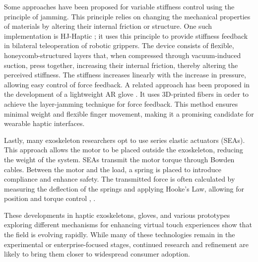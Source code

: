 \bigskip \noindent
Some approaches have been proposed for variable stiffness control using the principle of jamming. This principle relies on changing the mechanical properties of materials by altering their internal friction or structure. One such implementation is HJ-Haptic \cite{HJHaptic}; it uses this principle to provide stiffness feedback in bilateral teleoperation of robotic grippers. The device consists of flexible, honeycomb-structured layers that, when compressed through vacuum-induced suction, press together, increasing their internal friction, thereby altering the perceived stiffness. The stiffness increases linearly with the increase in pressure, allowing easy control of force feedback. A related approach has been proposed in the development of a lightweight AR glove \cite{gloveJamming}. It uses 3D-printed fibers in order to achieve the layer-jamming technique for force feedback. This method ensures minimal weight and flexible finger movement, making it a promising candidate for wearable haptic interfaces.

\bigskip \noindent
Lastly, many exoskeleton researchers opt to use series elastic actuators (SEAs). This approach allows the motor to be placed outside the exoskeleton, reducing the weight of the system. SEAs transmit the motor torque through Bowden cables. Between the motor and the load, a spring is placed to introduce compliance and enhance safety. The transmitted force is often calculated by measuring the deflection of the springs and applying Hooke's Law, allowing for position and torque control \cite{MARCONI201969}, \cite{Refour2019}.


\bigskip \noindent
These developments in haptic exoskeletons, gloves, and various prototypes exploring different mechanisms for enhancing virtual touch experiences show that the field is evolving rapidly. While many of these technologies remain in the experimental or enterprise-focused stages, continued research and refinement are likely to bring them closer to widespread consumer adoption.